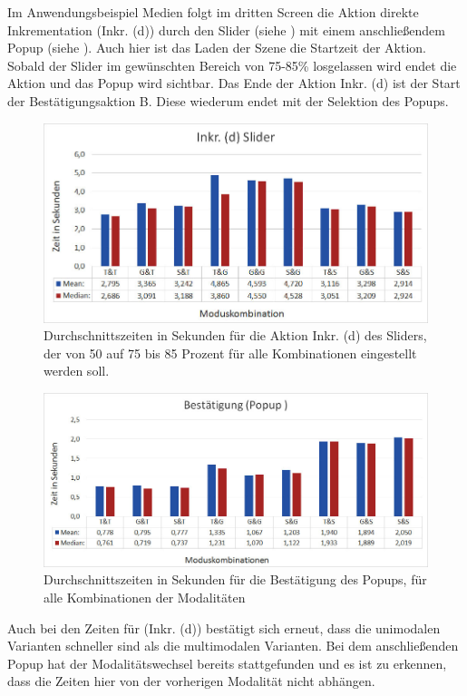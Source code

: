 Im Anwendungsbeispiel Medien folgt im dritten Screen die Aktion direkte Inkrementation (Inkr. (d)) durch den Slider (siehe ) mit einem anschließendem Popup (siehe ). 
Auch hier ist das Laden der Szene die Startzeit der Aktion. 
Sobald der Slider im gewünschten Bereich von 75-85\% losgelassen wird endet die Aktion und das Popup wird sichtbar. 
Das Ende der Aktion Inkr. (d) ist der Start der Bestätigungsaktion B. 
Diese wiederum endet mit der Selektion des Popups.
\begin{figure}[ht]
  \centering
  \includegraphics[width=1\textwidth]{img/Slider.JPG}
  \caption[Durchschnittszeiten für Inkr. (d)]{Durchschnittszeiten in Sekunden für die Aktion Inkr. (d) des Sliders, der von 50 auf 75 bis 85 Prozent für alle Kombinationen eingestellt werden soll.}
  \label{fig:Slider}
\end{figure} 
\begin{figure}[ht]
  \centering
  \includegraphics[width=1\textwidth]{img/PopupBestaetigung.JPG}
  \caption[Durchschnittszeiten für die Bestätigung des Popups]{Durchschnittszeiten in Sekunden für die Bestätigung des Popups, für alle Kombinationen der Modalitäten}
  \label{fig:Popup}
\end{figure} 
Auch bei den Zeiten für (Inkr. (d)) bestätigt sich erneut, dass die unimodalen Varianten schneller sind als die multimodalen Varianten. 
Bei dem anschließenden Popup hat der Modalitätswechsel bereits stattgefunden und es ist zu erkennen, dass die Zeiten hier von der vorherigen Modalität nicht abhängen.

